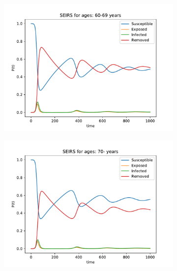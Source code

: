 \begin{figure}[H]
\begin{subfigure}{0.40\textwidth}
\includegraphics[width = \textwidth]{../fig/SEIRS_60-69_n.pdf}
\caption{\protect}
\end{subfigure}
\begin{subfigure}{0.40\textwidth}
\includegraphics[width = \textwidth]{../fig/SEIRS_70-_n.pdf}
\caption{\protect}
\end{subfigure}
\end{figure}


